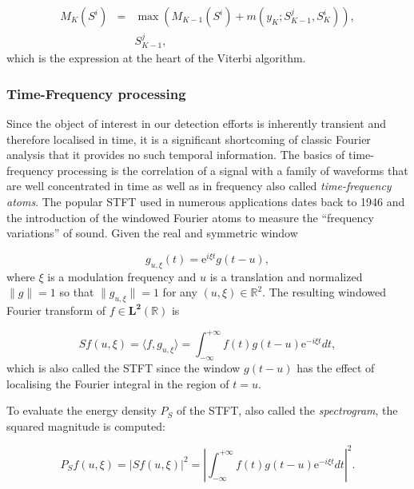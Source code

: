 \begin{eqnarray}\label{eq:viterbiLitRev5}
M_K(S^i) &=& \max \left( M_{K-1}(S^i) + m(y_K ; S_{K-1}^j, S_{K}^i)\right), \\ \nonumber
& & S_{K-1}^j,
\end{eqnarray}
which is the expression at the heart of the Viterbi algorithm\cite{Viterbi2006}.


\subsubsection{Time-Frequency processing}
Since the object of interest in our detection efforts is inherently transient and therefore localised in time, it is a significant shortcoming of classic Fourier analysis that it provides no such temporal information. The basics of time-frequency processing is the correlation of a signal with a family of waveforms that are well concentrated in time as well as in frequency\cite{Mallat1999} also called \emph{time-frequency atoms}\cite{Gabor1946}. The popular STFT used in numerous applications dates back to 1946 and the introduction of the windowed Fourier atoms to measure the ``frequency variations'' of sound. Given the real and symmetric window

\begin{equation}\label{eq:Mallat1999}
g_{u,\xi}(t) = \mathrm{e}^{i\xi t}g(t-u),
\end{equation}
where $\xi$ is a modulation frequency and $u$ is a translation and normalized $\|g\| = 1$ so that $\|g_{u,\xi}\| = 1$ for any $(u, \xi) \in \mathbb{R}^2$. The resulting windowed Fourier transform of $f \in \mathbf{L^2}(\mathbb{R})$ is

\begin{equation}\label{eq:Mallat1999_2}
S f(u, \xi) = \langle f, g_{u,\xi} \rangle = \int^{+\infty}_{-\infty}  f(t)g(t-u)\mathrm{e}^{-i\xi t} dt,
\end{equation}
which is also called the STFT since the window $g(t-u)$ has the effect of localising the Fourier integral in the region of $t=u$.

To evaluate the energy density $P_S$ of the STFT, also called the \emph{spectrogram}, the squared magnitude is computed:

\begin{equation}\label{eq:Mallat1999_3}
P_S f(u,\xi) = |S f(u,\xi)|^2 = \left| \int^{+\infty}_{-\infty} f(t)g(t-u)\mathrm{e}^{-i\xi t} dt \right|^2.
\end{equation}

